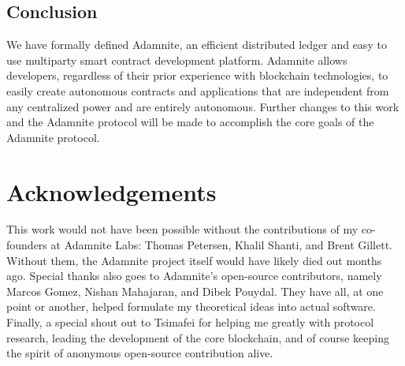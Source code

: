 \documentclass[conference]{IEEEtran}
\begin{document}
\subsection{Conclusion}
We have formally defined Adamnite, an efficient distributed ledger and easy to use multiparty smart contract development platform. Adamnite allows developers, regardless of their prior experience with blockchain technologies, to easily create autonomous contracts and applications that are independent from any centralized power and are entirely autonomous. Further changes to this work and the Adamnite protocol will be made to accomplish the core goals of the Adamnite protocol. 
\section{Acknowledgements}
This work would not have been possible without the contributions of my co-founders at Adamnite Labs: Thomas Petersen, Khalil Shanti, and Brent Gillett. Without them, the Adamnite project itself would have likely died out months ago. Special thanks also goes to Adamnite's open-source contributors, namely Marcos Gomez, Nishan Mahajaran, and Dibek Pouydal. They have all, at one point or another, helped formulate my theoretical ideas into actual software. Finally, a special shout out to Tsimafei for helping me greatly with protocol research, leading the development of the core blockchain, and of course keeping the spirit of anonymous open-source contribution alive. 
\end{document}
